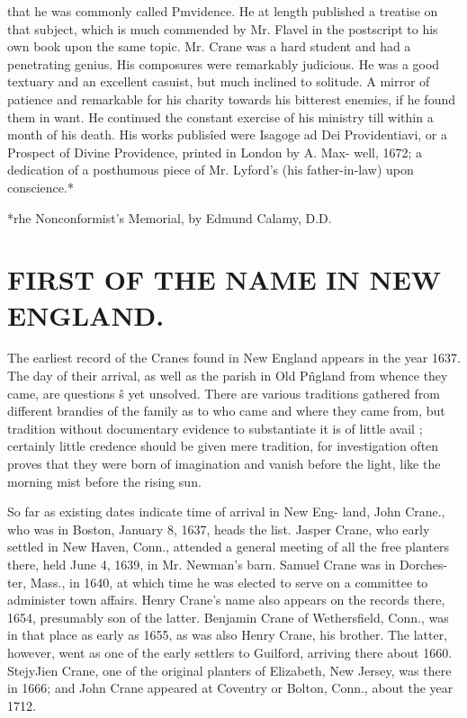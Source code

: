 \documentclass{book}
\begin{document}
that he was commonly called Pmvidence. He at length published 
a treatise on that subject, which is much commended by Mr. 
Flavel in the postscript to his own book upon the same topic. 
Mr. Crane was a hard student and had a penetrating genius. 
His composures were remarkably judicious. He was a good 
textuary and an excellent casuist, but much inclined to solitude. 
A mirror of patience and remarkable for his charity towards his 
bitterest enemies, if he found them in want. He continued the 
constant exercise of his ministry till within a month of his death. 
His works publis\^ied were Isagoge ad Dei Providentiavi, or a 
Prospect of Divine Providence, printed in London by A. Max- 
well, 1672; a dedication of a posthumous piece of Mr. Lyford's 
(his father-in-law) upon conscience.* 

*rhe Nonconformist's Memorial, by Edmund Calamy, D.D. 



\chapter{FIRST OF THE NAME IN NEW ENGLAND.}


The earliest record of the Cranes found in New England appears 
in the year 1637. The day of their arrival, as well as the parish 
in Old P\^ngland from whence they came, are questions \^s yet 
unsolved. There are various traditions gathered from different 
brandies of the family as to who came and where they came 
from, but tradition without documentary evidence to substantiate 
it is of little avail ; certainly little credence should be given mere 
tradition, for investigation often proves that they were born of 
imagination and vanish before the light, like the morning mist 
before the rising sun. 

So far as existing dates indicate time of arrival in New Eng- 
land, John Crane., who was in Boston, January 8, 1637, heads the 
list. Jasper Crane, who early settled in New Haven, Conn., 
attended a general meeting of all the free planters there, held June 
4, 1639, in Mr. Newman's barn. Samuel Crane was in Dorches- 
ter, Mass., in 1640, at which time he was elected to serve on a 
committee to administer town affairs. Henry Crane's name also 
appears on the records there, 1654, presumably son of the latter. 
Benjamin Crane of Wethersfield, Conn., was in that place as 
early as 1655, as was also Henry Crane, his brother. The latter, 
however, went as one of the early settlers to Guilford, arriving 
there about 1660. StejyJien Crane, one of the original planters 
of Elizabeth, New Jersey, was there in 1666; and John Crane 
appeared at Coventry or Bolton, Conn., about the year 1712. 
\end{document}
